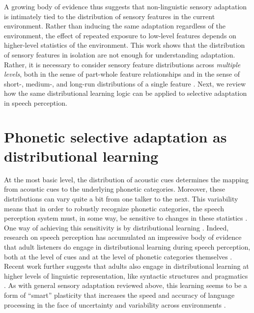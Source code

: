 A growing body of evidence thus suggests that non-linguistic sensory adaptation is intimately tied to the distribution of sensory features in the current environment.
Rather than inducing the same adaptation regardless of the environment, the effect of repeated exposure to low-level features depends on higher-level statistics of the environment. 
This work shows that the distribution of sensory features in isolation are not enough for understanding adaptation.  Rather, it is necessary to consider sensory feature distributions across \emph{multiple levels}, both in the sense of part-whole feature relationships \cite{He2012} and in the sense of short-, medium-, and long-run distributions of a single feature \cite{Chopin2012}.
Next, we review how the same distributional learning logic can be applied to selective adaptation in speech perception.


\section{Phonetic selective adaptation as distributional learning}
\label{sec:select-adapt-as}

At the most basic level, the distribution of acoustic cues determines the mapping from acoustic cues to the underlying phonetic categories.  Moreover, these distributions can vary quite a bit from one talker to the next.  This variability means that in order to robustly recognize phonetic categories, the speech perception system must, in some way, be sensitive to changes in these statistics \cite{Kleinschmidt2015,McMurray2011a}.  One way of achieving this sensitivity is by distributional learning
\autocite[for a review of additional means, such as normalization, see ][]{Weatherholz2015}. 
Indeed, research on speech perception has accumulated an impressive body of evidence that adult listeners do engage in distributional learning during speech perception, both at the level of cues \autocite[e.g., recalibration/perceptual learning, ][]{Bertelson2003,Clayards2008,Feldman2013b,Kraljic2007,Munson2011,Norris2003} and at the level of phonetic categories themselves \autocite[e.g. learning novel phonotactic constraints, ][]{Dell2004,Warker2006,Warker2009}.  Recent work further suggests that adults also engage in distributional learning at higher levels of linguistic representation, like syntactic structures \cite{Chang2006,Fine2013c,Jaeger2013a,Kamide2012} and pragmatics \cite{Kurumada2014,Kurumada2012,YildirimInPress}.  As with general sensory adaptation reviewed above, this learning seems to be a form of ``smart'' plasticity that increases the speed and accuracy of language processing in the face of uncertainty and variability across environments \cite[for review, see][]{Kleinschmidt2015}.

